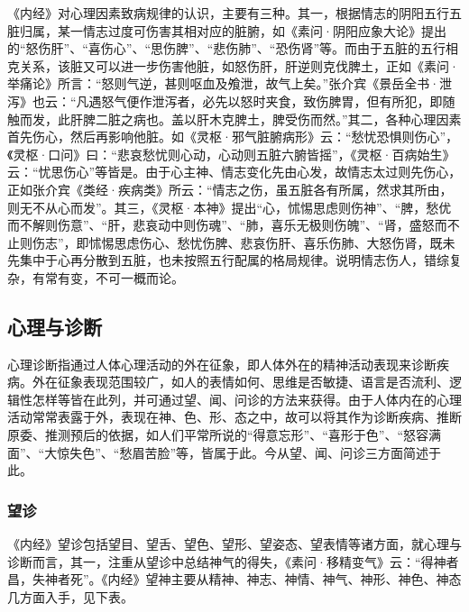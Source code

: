 \documentclass[12pt]{ctexbook}
\begin{document}
《内经》对心理因素致病规律的认识，主要有三种。其一，根据情志的阴阳五行五脏归属，某一情志过度可伤害其相对应的脏腑，如《素问·阴阳应象大论》提出的“怒伤肝”、“喜伤心”、“思伤脾”、“悲伤肺”、“恐伤肾”等。而由于五脏的五行相克关系，该脏又可以进一步伤害他脏，如怒伤肝，肝逆则克伐脾土，正如《素问·举痛论》所言：“怒则气逆，甚则呕血及飧泄，故气上矣。”张介宾《景岳全书·泄泻》也云：“凡遇怒气便作泄泻者，必先以怒时夹食，致伤脾胃，但有所犯，即随触而发，此肝脾二脏之病也。盖以肝木克脾土，脾受伤而然。”其二，各种心理因素首先伤心，然后再影响他脏。如《灵枢·邪气脏腑病形》云：“愁忧恐惧则伤心”，《灵枢·口问》曰：“悲哀愁忧则心动，心动则五脏六腑皆摇”，《灵枢·百病始生》云：“忧思伤心”等皆是。由于心主神、情志变化先由心发，故情志太过则先伤心，正如张介宾《类经·疾病类》所云：“情志之伤，虽五脏各有所属，然求其所由，则无不从心而发”。其三，《灵枢·本神》提出“心，怵惕思虑则伤神”、“脾，愁优而不解则伤意”、“肝，悲哀动中则伤魂”、“肺，喜乐无极则伤魄”、“肾，盛怒而不止则伤志”，即怵惕思虑伤心、愁忧伤脾、悲哀伤肝、喜乐伤肺、大怒伤肾，既未先集中于心再分散到五脏，也未按照五行配属的格局规律。说明情志伤人，错综复杂，有常有变，不可一概而论。

\subsection{心理与诊断}%

心理诊断指通过人体心理活动的外在征象，即人体外在的精神活动表现来诊断疾病。外在征象表现范围较广，如人的表情如何、思维是否敏捷、语言是否流利、逻辑性怎样等皆在此列，并可通过望、闻、问诊的方法来获得。由于人体内在的心理活动常常表露于外，表现在神、色、形、态之中，故可以将其作为诊断疾病、推断原委、推测预后的依据，如人们平常所说的“得意忘形”、“喜形于色”、“怒容满面”、“大惊失色”、“愁眉苦脸”等，皆属于此。今从望、闻、问诊三方面简述于此。

\subsubsection{望诊}%

《内经》望诊包括望目、望舌、望色、望形、望姿态、望表情等诸方面，就心理与诊断而言，其一，注重从望诊中总结神气的得失，《素问·移精变气》云：“得神者昌，失神者死”。《内经》望神主要从精神、神志、神情、神气、神形、神色、神态几方面入手，见下表。
\end{document}
